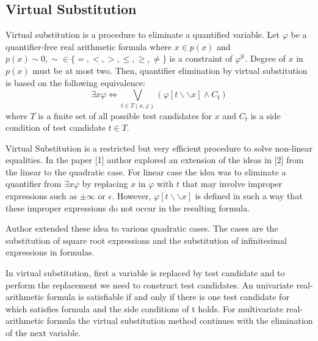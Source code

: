 \subsection{Virtual Substitution}
Virtual substitution is a procedure to eliminate a quantified variable. Let $\varphi$ be a quantifier-free real arithmetic formula where $x\in p(x)$ and $p(x) \sim 0, \sim \in \{=,<,>,\leq,\geq,\neq\}$ is a constraint of   $\varphi^\mathbb{R}$. Degree of $x$ in $p(x)$ must be at most two. Then, quantifier elimination by virtual substitution is based on the following equivalence:
$$ \exists x\varphi \Longleftrightarrow \bigvee\limits_{t\in T(x,\varphi)}  (\varphi [t\backslash\backslash x] \wedge C_t)$$
where $T$ is a finite set of all possible test candidates for $x$ and $C_t$ is a side condition of test candidate $t \in T$.

Virtual Substitution is a restricted but very efficient procedure to solve non-linear equalities. In the paper [1] author explored an extension of the ideas in [2] from the linear to the quadratic case. For linear case the idea was to eliminate a quantifier from $\exists x \varphi$ by replacing $x$ in $\varphi$ with $t$ that may involve improper expressions such as $\pm \infty$ or $\epsilon$. However, $\varphi [t\backslash\backslash x]$ is defined in such a way that these improper expressions do not occur in the resulting formula.

Author extended these idea to various quadratic cases. The cases are the substitution of square root expressions and the substitution of infinitesimal expressions in formulas.

In virtual substitution, first a variable is replaced by test candidate and to perform the replacement we need to construct test candidates. An univariate real-arithmetic formula is satisfiable if and only if there is one test candidate for which satisfies formula and the side conditions of t holds. For multivariate real-arithmetic formula the virtual substitution method continues with the elimination of the next variable.
